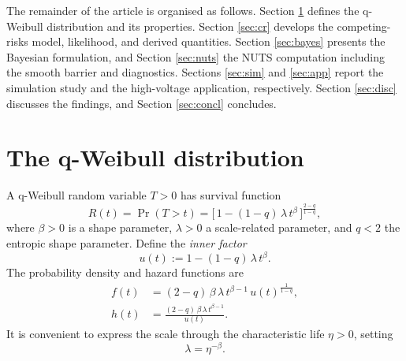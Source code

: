 \documentclass[ASNA,twocolumn]{USG}
\begin{document}
The remainder of the article is organised as follows. Section
\ref{sec:qw} defines the q-Weibull distribution and its properties.
Section \ref{sec:cr} develops the competing-risks model, likelihood, and
derived quantities. Section \ref{sec:bayes} presents the Bayesian
formulation, and Section \ref{sec:nuts} the NUTS computation including the
smooth barrier and diagnostics. Sections \ref{sec:sim} and
\ref{sec:app} report the simulation study and the high-voltage application,
respectively. Section \ref{sec:disc} discusses the findings, and Section
\ref{sec:concl} concludes.

\section{The q-Weibull distribution}\label{sec:qw}

A q-Weibull random variable $T>0$ has survival function
\begin{equation}\label{eq:R}
R(t) = \Pr(T>t)
     = \big[\,1-(1-q)\,\lambda\, t^{\beta}\,\big]^{\frac{2-q}{1-q}},
\end{equation}
where $\beta>0$ is a shape parameter, $\lambda>0$ a scale-related parameter,
and $q<2$ the entropic shape parameter. Define the \emph{inner factor}
\begin{equation}\label{eq:inner}
u(t) := 1-(1-q)\,\lambda\, t^{\beta}.
\end{equation}
The probability density and hazard functions are
\begin{align}
f(t) &= (2-q)\,\beta\,\lambda\,t^{\beta-1}\,
       u(t)^{\frac{1}{1-q}}, \label{eq:f}\\
h(t) &= \frac{(2-q)\,\beta\,\lambda\,t^{\beta-1}}{u(t)}. \label{eq:h}
\end{align}
It is convenient to express the scale through the characteristic life
$\eta>0$, setting
\begin{equation}\label{eq:lam}
\lambda = \eta^{-\beta}.
\end{equation}
\end{document}
